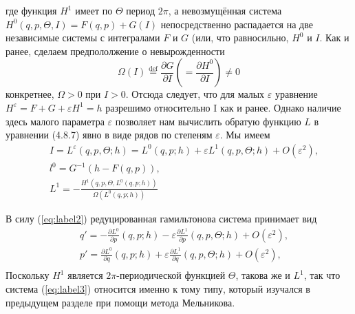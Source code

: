\documentclass[twoside, a4paper]{article}
\begin{document}
где функция $ H^1 $ имеет по $\Theta$ период $ 2\pi $, а невозмущённая система $H^0(q,p,\Theta,I)=F(q,p)+G(I)$ непосредственно распадается на две независимые системы с интегралами $F$ и $G$ (или, что равносильно, $H^0$ и $I$. Как и ранее, сделаем предпололжение о невырожденности
\newcommand*{\defeq}{\stackrel{\text{def}}{=}}
\begin{equation}
\Omega(I) \defeq \frac{\partial G}{\partial I} \left(=\frac{\partial H^0}{\partial I}\right) \neq 0
\end{equation}
конкретнее, $\Omega>0$ при $I>0$. Отсюда следует, что для малых $\varepsilon$ уравнение $H^\varepsilon = F+G+\varepsilon H^1=h$ разрешимо относительно I как и ранее. Однако наличие здесь малого параметра $\varepsilon$ позволяет нам вычислить обратую функцию $L$ в уравнении (4.8.7) %
явно в виде рядов по степеням $\varepsilon$. Мы имеем 
\begin{equation}
\text{~}\begin{aligned}
&I=L^\varepsilon (q,p,\Theta;h) = L^0(q,p;h)+\varepsilon L^1(q,p,\Theta;h) + O(\varepsilon^2),\\
&l^0=G^{-1}(h-F(q,p)),\\
&L^1=-\frac{H^1(q,p,\Theta,L^0(q,p;h))}{\Omega(L^0(q,p;h))}
\end{aligned}
\label{eq:label2}
\end{equation}

В силу (\ref{eq:label2}) редуцированная гамильтонова система принимает вид
\begin{equation}
\text{~}\begin{aligned}
&q'=-\frac{\partial L^0}{\partial p}(q,p;h)-\varepsilon\frac{\partial L^1}{\partial p}(q,p,\Theta;h)+O(\varepsilon^2),\\
&p'=\frac{\partial L^0}{\partial q}(q,p;h)+\varepsilon\frac{\partial L^1}{\partial q}(q,p,\Theta;h)+O(\varepsilon^2),\\
\end{aligned}
\label{eq:label3}
\end{equation}
Поскольку $H^1$ является $2\pi$-периодической функцией $\Theta$, такова же и $L^1$, так что система (\ref{eq:label3}) относится именно к тому типу, который изучался в предыдущем разделе при помощи метода Мельникова.
\end{document}

